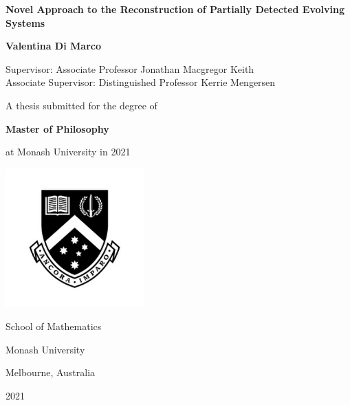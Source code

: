 \begin{titlepage}
  \begin{center}
    \vspace*{\fill}

\begin{center}
    { %
      \textbf{
        \Large Novel Approach to the Reconstruction of Partially Detected Evolving Systems
              } 
    }
\end{center}
    
    \vspace{2cm}
    
    {
      \Large
      \textbf{Valentina Di Marco}
    }

    \vspace{0.3cm}
    
    {
      \normalsize
      Supervisor: Associate Professor Jonathan Macgregor Keith \\
      Associate Supervisor: Distinguished Professor Kerrie Mengersen
      
    }
    
    \vspace{3cm}

    {
      \large
      A thesis submitted for the degree of

      \vspace{0.25cm}
      
      \textbf{Master of Philosophy}

      \vspace{0.25cm}
      
      at Monash University in 2021
    }
    
    \vspace{2.5cm}

    {
      \includegraphics[width=0.4\textwidth]{monash-logo}
    }

    {
      School of Mathematics
      
      Monash University
      
      Melbourne, Australia
      
      2021
    }
    
    \vspace*{\fill}
  \end{center}
\end{titlepage}

\clearpage
